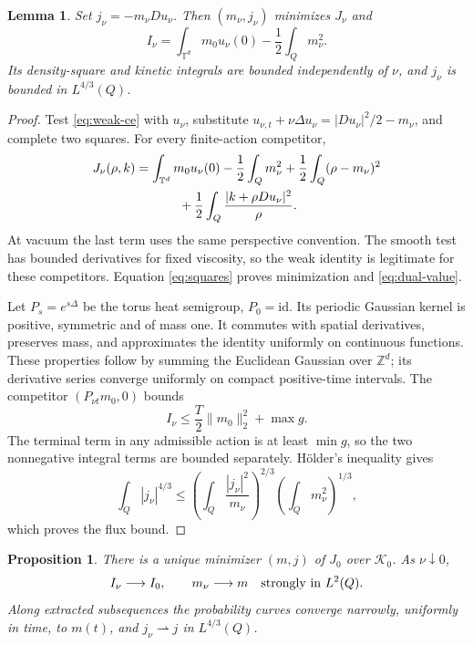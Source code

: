 \documentclass[11pt]{article}
\newcommand{\T}{\mathbb T}
\numberwithin{equation}{section}
\newtheorem{proposition}[theorem]{Proposition}
\newtheorem{lemma}[theorem]{Lemma}
\begin{document}
\begin{lemma}\label{lem:primal}
Set \(j_\nu=-m_\nu Du_\nu\). Then \((m_\nu,j_\nu)\) minimizes
\(J_\nu\) and
\begin{equation}\label{eq:dual-value}
 I_\nu=\int_{\T^d}m_0u_\nu(0)-\frac12\int_Qm_\nu^2.
\end{equation}
Its density-square and kinetic integrals are bounded independently of
\(\nu\), and \(j_\nu\) is bounded in \(L^{4/3}(Q)\).
\end{lemma}

\begin{proof}
Test \eqref{eq:weak-ce} with \(u_\nu\), substitute
\(u_{\nu,t}+\nu\Delta u_\nu=|Du_\nu|^2/2-m_\nu\), and complete
two squares. For every finite-action competitor,
\begin{align}
 J_\nu(\rho,k)
 &=\int_{\T^d}m_0u_\nu(0)-\frac12\int_Qm_\nu^2
       +\frac12\int_Q(\rho-m_\nu)^2 \notag\\
 &\hspace{12mm}
       +\frac12\int_Q\frac{|k+\rho Du_\nu|^2}{\rho}.
       \label{eq:squares}
\end{align}
At vacuum the last term uses the same perspective convention.
The smooth test has bounded derivatives for fixed viscosity, so the weak
identity is legitimate for these competitors. Equation \eqref{eq:squares}
proves minimization and \eqref{eq:dual-value}.

Let \(P_s=e^{s\Delta}\) be the torus heat semigroup, \(P_0=\mathrm{id}\).
Its periodic Gaussian kernel is positive, symmetric and of mass one.
It commutes with spatial derivatives, preserves mass, and approximates
the identity uniformly on continuous functions. These properties follow
by summing the Euclidean Gaussian over \(\mathbb Z^d\); its derivative
series converge uniformly on compact positive-time intervals.
The competitor \((P_{\nu t}m_0,0)\) bounds
\[
 I_\nu\le \frac T2\|m_0\|_2^2+\max g .
\]
The terminal term in any admissible action is at least \(\min g\),
so the two nonnegative integral terms are bounded separately.
H\"older's inequality gives
\begin{equation}\label{eq:flux}
 \int_Q|j_\nu|^{4/3}
 \le\left(\int_Q\frac{|j_\nu|^2}{m_\nu}\right)^{2/3}
       \left(\int_Qm_\nu^2\right)^{1/3},
\end{equation}
which proves the flux bound.
\end{proof}

\begin{proposition}\label{prop:density}
There is a unique minimizer \((m,j)\) of \(J_0\) over \(\mathcal K_0\).
As \(\nu\downarrow0\),
\[
 I_\nu\longrightarrow I_0,\qquad
 m_\nu\longrightarrow m\quad\hbox{strongly in }L^2(Q).
\]
Along extracted subsequences the probability curves converge narrowly,
uniformly in time, to \(m(t)\), and \(j_\nu\rightharpoonup j\) in
\(L^{4/3}(Q)\).
\end{proposition}
\end{document}
